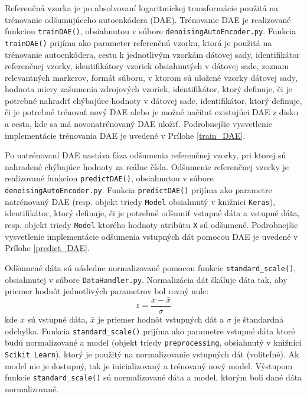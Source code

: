 Referenčná vzorka je po absolvovaní logaritmickej transformácie použitá na trénovanie odšumujúceho autoenkódera (DAE). Trénovanie DAE je realizované funkciou \texttt{trainDAE()}, obsiahnutou v súbore \texttt{denoisingAutoEncoder.py}. Funkcia \texttt{trainDAE()} prijíma ako parameter referenčnú vzorku, ktorá je použitá na trénovanie autoenkódera, cestu k jednotlivým vzorkám dátovej sady, identifikátor referenčnej vzorky, identifikátory vzoriek obsiahnutých v dátovej sade, zoznam relevantných markerov, formát súboru, v ktorom sú uložené vzorky dátovej sady, hodnota miery zašumenia zdrojových vzoriek, identifikátor, ktorý definuje, či je potrebné nahradiť chýbajúce hodnoty v dátovej sade, identifikátor, ktorý definuje, či je potrebné trénovať nový DAE alebo je možné načítať existujúci DAE z disku a cesta, kde sa má novonatrénovaný DAE uložiť. Podrobnejšie vysvetlenie implementácie trénovania DAE je uvedené v Prílohe \ref{train_DAE}. 

Po natrénovaní DAE nastáva fáza odšumenia referenčnej vzorky, pri ktorej sú nahradené chýbajúce hodnoty za reálne čísla. Odšumenie referenčnej vzorky je realizované funkciou \texttt{predictDAE()}, obsiahnutou v súbore \texttt{denoisingAutoEncoder.py}.  Funkcia \texttt{predictDAE()} prijíma ako parametre natrénovaný DAE (resp. objekt triedy \texttt{Model} obsiahnutý v knižnici \texttt{Keras}), identifikátor, ktorý definuje, či je potrebné odšumiť vstupné dáta a vstupné dáta, resp. objekt triedy \texttt{Model} ktorého hodnoty atribútu \texttt{X} sú odšumené. Podrobnejšie vysvetlenie implementácie odšumenia vstupných dát pomocou DAE je uvedené v Prílohe \ref{predict_DAE}. 
 
Odšumené dáta sú následne normalizované pomocou funkcie \texttt{standard_scale()}, obsiahnutej v súbore \texttt{DataHandler.py}. Normalizácia dát škáluje dáta tak, aby priemer hodnôt jednotlivých parametrov bol rovný nule:
\[
z = \frac{x-\bar{x}}{\sigma}
\]
kde $x$ sú vstupné dáta, $\bar{x}$ je priemer hodnôt vstupných dát a $\sigma$ je štandardná odchylka. Funkcia \texttt{standard_scale()} prijíma ako parametre vstupné dáta ktoré budú normalizované a model (objekt triedy \texttt{preprocessing}, obsiahnutý v knižnici \texttt{Scikit Learn}), ktorý je použitý na normalizovanie vstupných dát (voliteľné). Ak model nie je dostupný, tak je inicializovaný a trénovaný nový model. Výstupom funkcie \texttt{standard_scale()} sú normalizované dáta a model, ktorým boli dané dáta normalizované.

